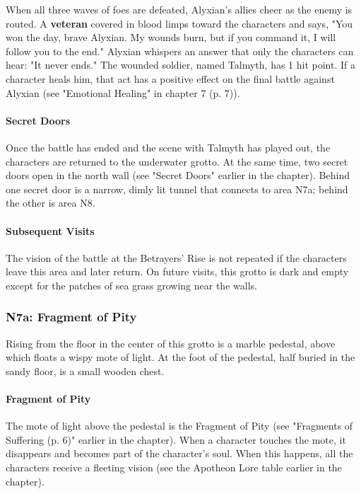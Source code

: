\documentclass[a4paper, 11pt, bg=full, twocolumn, nooutline]{dndbook}
\begin{document}
When all three waves of foes are defeated, Alyxian's allies cheer as the enemy is routed. A \textbf{veteran} covered in blood limps toward the characters and says, "You won the day, brave Alyxian. My wounds burn, but if you command it, I will follow you to the end." Alyxian whispers an answer that only the characters can hear: "It never ends." The wounded soldier, named Talmyth, has 1 hit point. If a character heals him, that act has a positive effect on the final battle against Alyxian (see "Emotional Healing" in chapter 7 (p. 7)).

\paragraph{Secret Doors}

Once the battle has ended and the scene with Talmyth has played out, the characters are returned to the underwater grotto. At the same time, two secret doors open in the north wall (see "Secret Doors" earlier in the chapter). Behind one secret door is a narrow, dimly lit tunnel that connects to area N7a; behind the other is area N8.

\paragraph{Subsequent Visits}

The vision of the battle at the Betrayers' Rise is not repeated if the characters leave this area and later return. On future visits, this grotto is dark and empty except for the patches of sea grass growing near the walls.

\subsubsection{N7a: Fragment of Pity}

\begin{DndReadAloud}
Rising from the floor in the center of this grotto is a marble pedestal, above which floats a wispy mote of light. At the foot of the pedestal, half buried in the sandy floor, is a small wooden chest.
\end{DndReadAloud}

\paragraph{Fragment of Pity}

The mote of light above the pedestal is the Fragment of Pity (see "Fragments of Suffering (p. 6)" earlier in the chapter). When a character touches the mote, it disappears and becomes part of the character's soul. When this happens, all the characters receive a fleeting vision (see the Apotheon Lore table earlier in the chapter).
\end{document}

